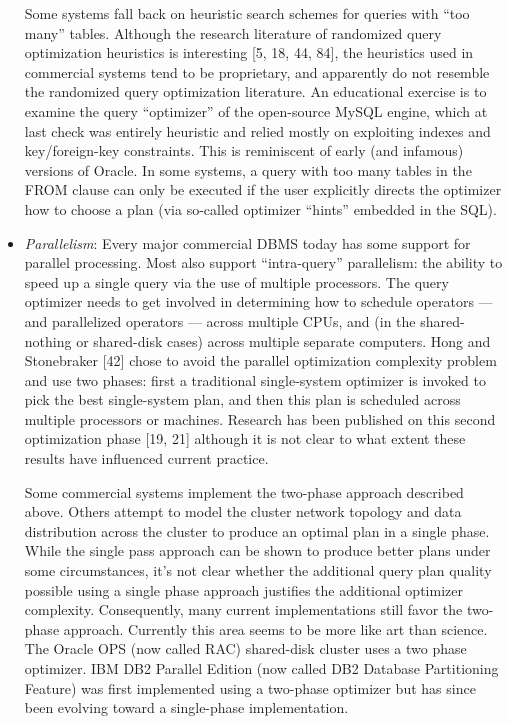 \documentclass[b5paper,11pt,twoside,openright]{book}
\begin{document}
\begin{itemize}
Some systems fall back on heuristic search schemes for queries with
``too many'' tables. Although the research literature of randomized
query optimization heuristics is interesting {[}5, 18, 44, 84{]}, the
heuristics used in commercial systems tend to be proprietary, and
apparently do not resemble the randomized query optimization literature.
An educational exercise is to examine the query ``optimizer'' of the
open-source MySQL engine, which at last check was entirely heuristic and
relied mostly on exploiting indexes and key/foreign-key constraints.
This is reminiscent of early (and infamous) versions of Oracle. In some
systems, a query with too many tables in the FROM clause can only be
executed if the user explicitly directs the optimizer how to choose a
plan (via so-called optimizer ``hints'' embedded in the SQL).

\item
  \emph{Parallelism}: Every major commercial DBMS today has some support
  for parallel processing. Most also support ``intra-query''
  parallelism: the ability to speed up a single query via the use of
  multiple processors. The query optimizer needs to get involved in
  determining how to schedule operators --- and parallelized operators
  --- across multiple CPUs, and (in the shared-nothing or shared-disk
  cases) across multiple separate computers. Hong and Stonebraker
  {[}42{]} chose to avoid the parallel optimization complexity problem
  and use two phases: first a traditional single-system optimizer is
  invoked to pick the best single-system plan, and then this plan is
  scheduled across multiple processors or machines. Research has been
  published on this second optimization phase {[}19, 21{]} although it
  is not clear to what extent these results have influenced current
  practice.

Some commercial systems implement the two-phase approach described
above. Others attempt to model the cluster network topology and data
distribution across the cluster to produce an optimal plan in a single
phase. While the single pass approach can be shown to produce better
plans under some circumstances, it's not clear whether the additional
query plan quality possible using a single phase approach justifies the
additional optimizer complexity. Consequently, many current
implementations still favor the two-phase approach. Currently this area
seems to be more like art than science. The Oracle OPS (now called RAC)
shared-disk cluster uses a two phase optimizer. IBM DB2 Parallel Edition
(now called DB2 Database Partitioning Feature) was first implemented
using a two-phase optimizer but has since been evolving toward a
single-phase implementation.


\end{itemize}
\end{document}
